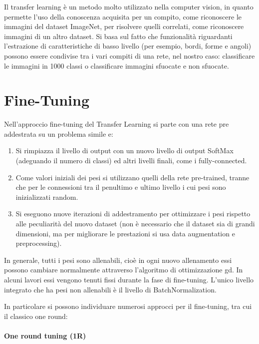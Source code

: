 Il transfer learning è un metodo molto utilizzato nella computer vision, in quanto permette l'uso della conoscenza acquisita per un
compito, come riconoscere le immagini del dataset ImageNet, per risolvere quelli correlati, come riconoscere immagini di un altro dataset. Si basa sul fatto che
funzionalità riguardanti l'estrazione di caratteristiche di basso livello
(per esempio, bordi, forme e angoli) possono essere condivise tra i vari compiti di una rete, nel nostro caso: classificare le immagini in 1000 classi o classificare immagini sfuocate e non sfuocate\cite{patrini_tl}.




\section{Fine-Tuning}\label{fine-tuning}

Nell'approccio fine-tuning del Transfer Learning si parte con una rete pre addestrata su un problema simile e:
\begin{enumerate}
    \item Si rimpiazza il livello di output con un nuovo livello di output \gls{SoftMax} (adeguando il numero di classi) ed altri livelli finali, come i \gls{fully-connected}.
    \item Come valori iniziali dei pesi si utilizzano quelli della rete pre-trained, tranne che per le connessioni tra il penultimo e ultimo livello i cui pesi sono inizializzati random.
    \item Si eseguono nuove iterazioni di addestramento per ottimizzare i pesi rispetto alle peculiarità del nuovo dataset (non è necessario che il dataset sia di grandi dimensioni, ma per migliorare le prestazioni si usa data augmentation e preprocessing).
\end{enumerate}

In generale, tutti i pesi sono allenabili, cioè in  ogni nuovo allenamento essi possono cambiare normalmente attraverso l'algoritmo di ottimizzazione \gls{gd}. In alcuni lavori essi vengono tenuti fissi durante la fase di fine-tuning. L'unico livello integrato che ha pesi non allenabili è il livello di \gls{BatchNormalization}\cite{team_keras_nodate}\cite{lumini_plankton}.

In particolare si possono individuare numerosi approcci per il fine-tuning, tra cui il classico one round:
\paragraph {One round tuning (1R)} \label{one-round-tuning}

